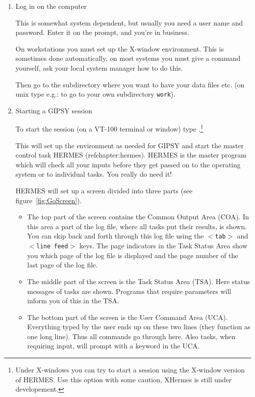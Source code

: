 \begin{enumerate}

\item Log in on the computer

This is somewhat system dependent, but usually you need a user name and
password. Enter it on the prompt, and you're in business.

On workstations you must set up the X-window environment. This
is sometimes done automatically, on most systems you must give a
command yourself, ask your local system manager how to do this.

Then go to the subdirectory where you want to have your data files etc.
(on unix type e.g.:  to go to your own subdirectory
{\tt work}).

\item Starting a GIPSY session

To start the session (on a VT-100 terminal or window) type
 \carr.\footnote{Under X-windows you can try
 \carr to start a session using the X-window version of
HERMES.  Use this option with some caution, XHermes is still under
developement.}

This will set up the environment as needed for GIPSY and
start the master control task HERMES (ref{chapter:hermes}). 
HERMES is the master program which will check all your inputs before they get passed on 
to the operating system or to individual tasks. You really do need it!

HERMES will set up a screen divided into three parts (see
figure~\ref{fig:GoScreen}). 

\begin{itemize}

\item The top part of the screen contains the Common Output Area (COA). 
In this area a part of the log file, where all tasks put their results,
is shown.  You can skip back and forth through this log file using the
{\tt $<$tab$>$} and {\tt $<$line~feed$>$} keys.  The page indicators in
the Task Status Area show you which page of the log file is displayed
and the page number of the last page of the log file. 

\item The middle part of the screen is the Task Status Area (TSA). Here
status messages of tasks are shown. Programs that require parameters
will inform you of this in the TSA.

\item The bottom part of the screen is the User Command Area (UCA).
Everything typed by the user ends up on these two lines (they function
as one long line). Thus all commands go through here. Also tasks, when
requiring input, will prompt with a keyword in the UCA.


\end{itemize}
\end{enumerate}
